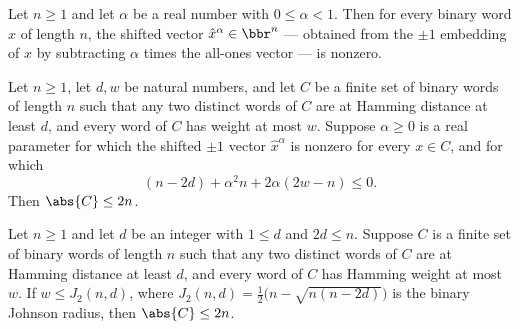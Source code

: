 \begin{lemma}
\label{CodingTheory.Johnson.shifted_ne_zero_of_alpha_lt_one}
\leanok
{}
Let $n \ge 1$ and let $\alpha$ be a real number with $0 \le \alpha < 1$. Then for every
binary word $x$ of length $n$, the shifted vector $\hat{x}^\alpha \in \bbr^n$ — obtained
from the $\pm 1$ embedding of $x$ by subtracting $\alpha$ times the all-ones vector — is
nonzero.
\end{lemma}

\begin{theorem}
\label{CodingTheory.Johnson.binary_johnson_card_bound_parametric}
\leanok
{}
Let $n \ge 1$, let $d, w$ be natural numbers, and let $C$ be a finite set of binary
words of length $n$ such that any two distinct words of $C$ are at Hamming distance at
least $d$, and every word of $C$ has weight at most $w$. Suppose $\alpha \ge 0$ is a
real parameter for which the shifted $\pm 1$ vector $\hat{x}^\alpha$ is nonzero for
every $x \in C$, and for which
\[
(n - 2d) + \alpha^2 n + 2\alpha(2w - n) \le 0 .
\]
Then $\abs{C} \le 2n$.
\end{theorem}

\begin{theorem}
\label{CodingTheory.Johnson.binary_johnson_card_bound}
\leanok
{}
Let $n \ge 1$ and let $d$ be an integer with $1 \le d$ and $2d \le n$. Suppose $C$ is a
finite set of binary words of length $n$ such that any two distinct words of $C$ are at
Hamming distance at least $d$, and every word of $C$ has Hamming weight at most $w$. If
$w \le J_2(n,d)$, where $J_2(n,d) = \tfrac{1}{2}\bigl(n - \sqrt{n(n-2d)}\bigr)$ is the
binary Johnson radius, then $\abs{C} \le 2n$.
\end{theorem}

